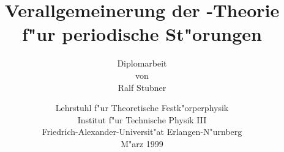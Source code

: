 
\title{\bf Verallgemeinerung der \kdotp-Theorie f"ur periodische St"orungen\vspace{3cm}}

\author{Diplomarbeit\\[3ex]
  von\\[3ex]
  Ralf Stubner\vspace{3cm}}

\date{Lehrstuhl f"ur Theoretische Festk"orperphysik\\
  Institut f"ur Technische Physik III\\
  Friedrich-Alexander-Universit"at Erlangen-N"urnberg\\[1cm]
  M"arz 1999}

\maketitle




